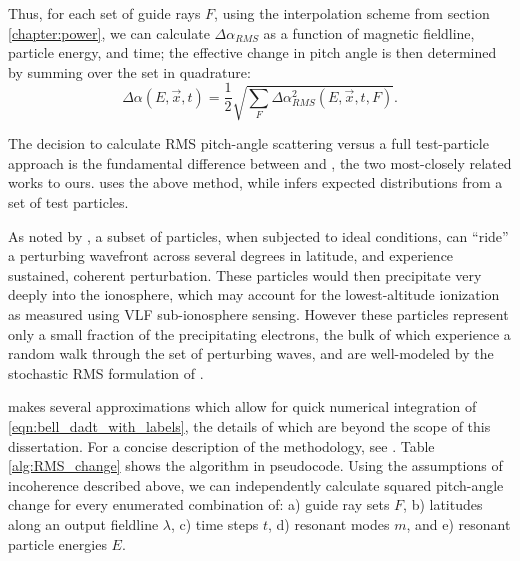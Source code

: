 Thus, for each set of guide rays $F$, using the interpolation scheme from section \ref{chapter:power}, we can calculate $\Delta \alpha_{RMS}$ as a function of magnetic fieldline, particle energy, and time; the effective change in pitch angle is then determined by summing over the set in quadrature: 
\begin{equation}
\Delta \alpha(E, \vec{x}, t) = \frac{1}{2}\sqrt{\sum_{F} \Delta \alpha_{RMS}^2(E, \vec{x},t, F)}.
\end{equation}

The decision to calculate RMS pitch-angle scattering versus a full test-particle approach is the fundamental difference between \cite{Lauben1998} and \cite{Bortnik2005}, the two most-closely related works to ours. \citeauthor{Bortnik2005} uses the above method, while \citeauthor{Lauben1998} infers expected distributions from a set of test particles. 

As noted by \cite{Lauben1998, Lauben2001}, a subset of particles, when subjected to ideal conditions, can ``ride'' a perturbing wavefront across several degrees in latitude, and experience sustained, coherent perturbation. These particles would then precipitate very deeply into the ionosphere, which may account for the lowest-altitude ionization as measured using VLF sub-ionosphere sensing. However these particles represent only a small fraction of the precipitating electrons, the bulk of which experience a random walk through the set of perturbing waves, and are well-modeled by the stochastic RMS formulation of \citeauthor{Bortnik2005}.

\citeauthor{Bortnik2005} makes several approximations which allow for quick numerical integration of \eqref{eqn:bell_dadt_with_labels}, the details of which are beyond the scope of this dissertation. For a concise description of the methodology, see \cite{Bortnik2006}. Table \ref{alg:RMS_change} shows the algorithm in pseudocode. Using the assumptions of incoherence described above, we can independently calculate squared pitch-angle change for every enumerated combination of: a) guide ray sets $F$, b) latitudes along an output fieldline $\lambda$, c) time steps $t$, d) resonant modes $m$, and e) resonant particle energies $E$. 

